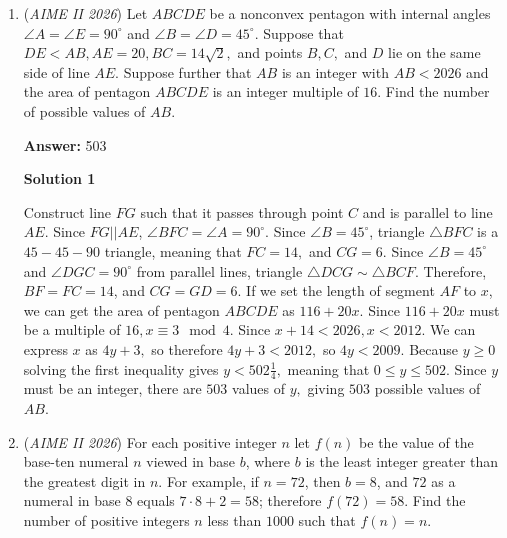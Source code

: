 \begin{enumerate}
 



\textbf{Solution 6 (Engineer's Induction)}

Start by testing smaller cases starting with 1 square, which has 3 ways to reach the top right corner. For two squares, you get 9, and for 3 squares you get 27. We can see that for n squares there are $3^n$ paths, so by Engineer's Induction, for 10 squares there are $3^{10}$ so $\sqrt{N}=3^5=\boxed{243}$



	\item (\textit{AIME II 2026}) Let $ABCDE$ be a nonconvex pentagon with internal angles $\angle A = \angle E = 90^\circ$ and $\angle B = \angle D = 45^\circ.$ Suppose that $DE < AB, AE = 20, BC = 14\sqrt2,$ and points $B,C,$ and $D$ lie on the same side of line $AE.$ Suppose further that $AB$ is an integer with $AB < 2026$ and the area of pentagon $ABCDE$ is an integer multiple of $16.$ Find the number of possible values of $AB.$

 \textbf{Answer: }503



\textbf{Solution 1}

Construct line $FG$ such that it passes through point $C$ and is parallel to line $AE$. Since $FG||AE$, $\angle BFC = \angle A = 90^\circ.$ Since $\angle B = 45^\circ$, triangle $\triangle BFC$ is a $45-45-90$ triangle, meaning that $FC=14,$ and $CG=6.$ Since $\angle B = 45^\circ$ and $\angle DGC=90^\circ$ from parallel lines, triangle $\triangle DCG \sim{\triangle BCF}.$ Therefore, $BF=FC=14$, and $CG=GD=6.$ If we set the length of segment $AF$ to $x$, we can get the area of pentagon $ABCDE$ as $116+20x.$ Since $116+20x$ must be a multiple of $16, x\equiv 3\mod{4}.$ Since $x+14<2026, x<2012.$ We can express $x$ as $4y+3,$ so therefore $4y+3<2012,$ so $4y<2009.$ Because $y\ge0$ solving the first inequality gives $y<502\frac{1}{4},$ meaning that $0\le y \le 502.$ Since $y$ must be an integer, there are $503$ values of $y,$ giving $\boxed{503}$ possible values of $AB.$



	\item (\textit{AIME II 2026}) For each positive integer $n$ let $f(n)$ be the value of the base-ten numeral $n$ viewed in base $b$, where $b$ is the least integer greater than the greatest digit in $n$. For example, if $n=72$, then $b=8$, and $72$ as a numeral in base $8$ equals $7\cdot 8+2=58$; therefore $f(72)=58$. Find the number of positive integers $n$ less than $1000$ such that $f(n)=n$.



\end{enumerate}
